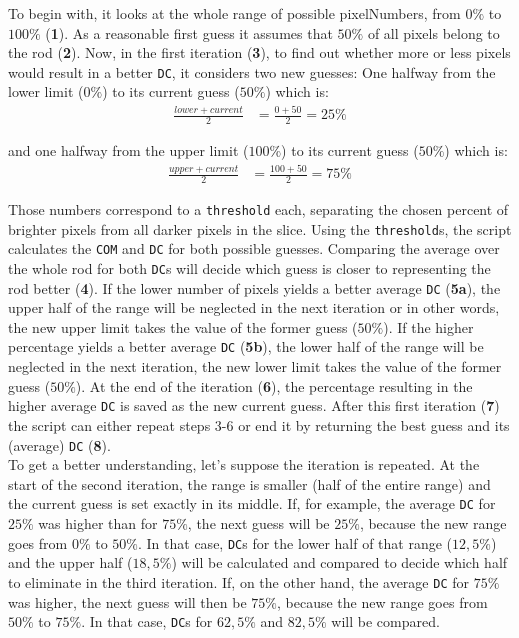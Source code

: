 To begin with, it looks at the whole range of possible pixelNumbers, from $0\%$ to $100\%$ (\textbf{1}).
As a reasonable first guess it assumes that $50\%$ of all pixels belong to the rod (\textbf{2}).
Now, in the first iteration (\textbf{3}), to find out whether more or less pixels would result in a better \texttt{DC}, it considers two new guesses:
One halfway from the lower limit ($0\%$) to its current guess ($50\%$) which is:
\begin{align}
  \frac{lower + current}{2} &= \frac{0+50}{2}=25\% 
\end{align}

and one halfway from the upper limit ($100\%$) to its current guess ($50\%$) which is:
\begin{align}
 \frac{upper + current}{2} &= \frac{100+50}{2}=75\%
\end{align}


Those numbers correspond to a \texttt{threshold} each, separating the chosen percent of brighter pixels from all darker pixels in the slice.
Using the \texttt{threshold}s, the script calculates the \texttt{COM} and \texttt{DC} for both possible guesses.
Comparing the average over the whole rod for both \texttt{DC}s will decide which guess is closer to representing the rod better (\textbf{4}).
If the lower number of pixels yields a better average \texttt{DC} (\textbf{5a}), the upper half of the range will be neglected in the next iteration or in other words, the new upper limit takes the value of the former guess ($50\%$).
If the higher percentage yields a better average \texttt{DC} (\textbf{5b}), the lower half of the range will be neglected in the next iteration, the new lower limit takes the value of the former guess ($50\%$).
At the end of the iteration (\textbf{6}), the percentage resulting in the higher average \texttt{DC} is saved as the new current guess.
After this first iteration (\textbf{7}) the script can either repeat steps 3-6 or end it by returning the best guess and its (average) \texttt{DC} (\textbf{8}).\\

To get a better understanding, let's suppose the iteration is repeated.
At the start of the second iteration, the range is smaller (half of the entire range) and the current guess is set exactly in its middle.
If, for example, the average \texttt{DC} for $25\%$ was higher than for $75\%$, the next guess will be $25\%$, because the new range goes from $0\%$ to $50\%$.
In that case, \texttt{DC}s for the lower half of that range ($12,5\%$) and the upper half ($18,5\%$) will be calculated and compared to decide which half to eliminate in the third iteration.
If, on the other hand, the average \texttt{DC} for $75\%$ was higher, the next guess will then be $75\%$, because the new range goes from $50\%$ to $75\%$.
In that case, \texttt{DC}s for $62,5\%$ and $82,5\%$ will be compared.


